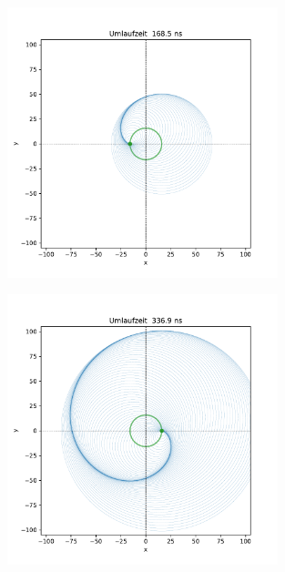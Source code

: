\documentclass[11pt,a4paper]{article}
\begin{document}
        \begin{figure}[h]
            \centering
            \includegraphics[width=0.7\textwidth]{synchrotron-0168.5.pdf}
        \end{figure}

        \begin{figure}[h]
            \centering
            \includegraphics[width=0.7\textwidth]{synchrotron-0336.9.pdf}
        \end{figure}
\end{document}
